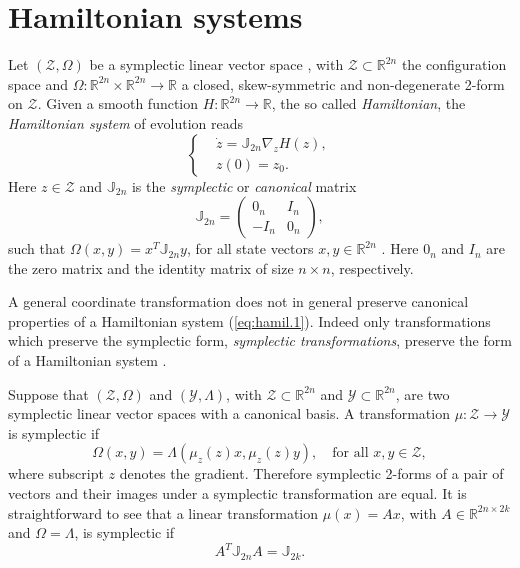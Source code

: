 \section{Hamiltonian systems}
\label{sec:hamil}

Let $(\mathcal Z, \Omega)$ be a symplectic linear vector space \cite{Marsden:2010:IMS:1965128}, with $\mathcal Z \subset \mathbb R^{2n}$ the configuration space and $\Omega:\mathbb R^{2n}\times\mathbb R^{2n} \to \mathbb R$ a closed, skew-symmetric and non-degenerate 2-form on $\mathcal Z$. Given a smooth function $H:\mathbb R^{2n} \to \mathbb R$, the so called \emph{Hamiltonian}, the \emph{Hamiltonian system} of evolution reads
\begin{equation} \label{eq:hamil.1}
\left\{
\begin{aligned}
	& \dot z = \mathbb J_{2n} \nabla_z H(z),  \\
	&  z(0) = z_0.
\end{aligned}
\right.
\end{equation}
Here $z\in \mathcal Z$  and $\mathbb J_{2n}$ is the \emph{symplectic} or \emph{canonical} matrix
\begin{equation} \label{eq:hamil.2}
	\mathbb{J}_{2n} = 
	\begin{pmatrix}
	0_n & I_n \\
	-I_n & 0_n
	\end{pmatrix},
\end{equation}
such that $\Omega(x,y) = x^T\mathbb J_{2n}y$, for all state vectors $x,y\in \mathbb R^{2n}$ \cite{Marsden:2010:IMS:1965128}. Here $0_n$ and $I_n$ are the zero matrix and the identity matrix of size $n\times n$, respectively.

A general coordinate transformation does not in general preserve canonical properties of a Hamiltonian system (\ref{eq:hamil.1}). Indeed only transformations which preserve the symplectic form, \emph{symplectic transformations}, preserve the form of a Hamiltonian system \cite{Hairer:1250576}.

Suppose that $(\mathcal Z,\Omega)$ and $(\mathcal Y,\Lambda)$, with $\mathcal Z \subset \mathbb R^{2n}$ and $\mathcal Y \subset \mathbb R^{2n}$, are two symplectic linear vector spaces with a canonical basis. A transformation $\mu:\mathcal Z\to\mathcal Y$ is symplectic if
\begin{equation} \label{eq:hamil.3}
	\Omega(x,y) = \Lambda(\mu_z(z)x,\mu_z(z)y), \quad \text{for all } x,y\in\mathcal Z,
\end{equation}
where subscript $z$ denotes the gradient. Therefore symplectic 2-forms of a pair of vectors and their images under a symplectic transformation are equal. It is straightforward to see that a linear transformation $\mu(x) = Ax$, with $A\in \mathbb R^{2n\times 2k}$ and $\Omega = \Lambda$, is symplectic if
\begin{equation} \label{eq:hamil.4}
	A^T \mathbb J_{2n} A = \mathbb J_{2k}.
\end{equation}

